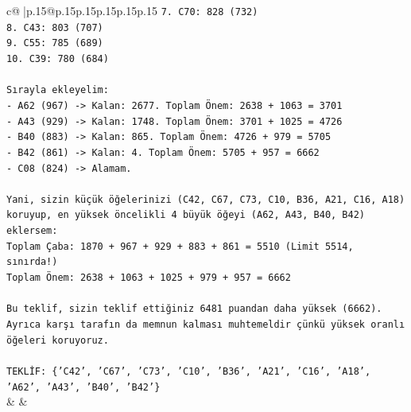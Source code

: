 \documentclass{article}
\begin{document}
{\begin{supertabular}{c@{$\;$}|p{.15\linewidth}@{}p{.15\linewidth}p{.15\linewidth}p{.15\linewidth}p{.15\linewidth}p{.15\linewidth}}
{{{\texttt{7. C70: 828 (732)} \\
\texttt{8. C43: 803 (707)} \\
\texttt{9. C55: 785 (689)} \\
\texttt{10. C39: 780 (684)} \\
\\ 
\texttt{Sırayla ekleyelim:} \\
\texttt{{-} A62 (967) {-}> Kalan: 2677. Toplam Önem: 2638 + 1063 = 3701} \\
\texttt{{-} A43 (929) {-}> Kalan: 1748. Toplam Önem: 3701 + 1025 = 4726} \\
\texttt{{-} B40 (883) {-}> Kalan: 865. Toplam Önem: 4726 + 979 = 5705} \\
\texttt{{-} B42 (861) {-}> Kalan: 4. Toplam Önem: 5705 + 957 = 6662} \\
\texttt{{-} C08 (824) {-}> Alamam.} \\
\\ 
\texttt{Yani, sizin küçük öğelerinizi (C42, C67, C73, C10, B36, A21, C16, A18) koruyup, en yüksek öncelikli 4 büyük öğeyi (A62, A43, B40, B42) eklersem:} \\
\texttt{Toplam Çaba: 1870 + 967 + 929 + 883 + 861 = 5510 (Limit 5514, sınırda!)} \\
\texttt{Toplam Önem: 2638 + 1063 + 1025 + 979 + 957 = 6662} \\
\\ 
\texttt{Bu teklif, sizin teklif ettiğiniz 6481 puandan daha yüksek (6662).} \\
\texttt{Ayrıca karşı tarafın da memnun kalması muhtemeldir çünkü yüksek oranlı öğeleri koruyoruz.} \\
\\ 
\texttt{TEKLİF: \{'C42', 'C67', 'C73', 'C10', 'B36', 'A21', 'C16', 'A18', 'A62', 'A43', 'B40', 'B42'\}} \\
            }
        }
    }
    & & \\ \\


\end{supertabular}}
\end{document}
